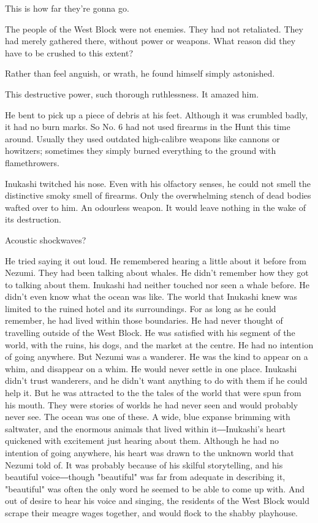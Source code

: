 This is how far they're gonna go.

The people of the West Block were not enemies. They had not retaliated.
They had merely gathered there, without power or weapons. What reason
did they have to be crushed to this extent?

Rather than feel anguish, or wrath, he found himself simply astonished.

This destructive power, such thorough ruthlessness. It amazed him.

He bent to pick up a piece of debris at his feet. Although it was
crumbled badly, it had no burn marks. So No. 6 had not used firearms in
the Hunt this time around. Usually they used outdated high-calibre
weapons like cannons or howitzers; sometimes they simply burned
everything to the ground with flamethrowers.

Inukashi twitched his nose. Even with his olfactory senses, he could not
smell the distinctive smoky smell of firearms. Only the overwhelming
stench of dead bodies wafted over to him. An odourless weapon. It would
leave nothing in the wake of its destruction.

Acoustic shockwaves?

He tried saying it out loud. He remembered hearing a little about it
before from Nezumi. They had been talking about whales. He didn't
remember how they got to talking about them. Inukashi had neither
touched nor seen a whale before. He didn't even know what the ocean was
like. The world that Inukashi knew was limited to the ruined hotel and
its surroundings. For as long as he could remember, he had lived within
those boundaries. He had never thought of travelling outside of the West
Block. He was satisfied with his segment of the world, with the ruins,
his dogs, and the market at the centre. He had no intention of going
anywhere. But Nezumi was a wanderer. He was the kind to appear on a
whim, and disappear on a whim. He would never settle in one place.
Inukashi didn't trust wanderers, and he didn't want anything to do with
them if he could help it. But he was attracted to the the tales of the
world that were spun from his mouth. They were stories of worlds he had
never seen and would probably never see. The ocean was one of these. A
wide, blue expanse brimming with saltwater, and the enormous animals
that lived within it―Inukashi's heart quickened with excitement just
hearing about them. Although he had no intention of going anywhere, his
heart was drawn to the unknown world that Nezumi told of. It was
probably because of his skilful storytelling, and his beautiful
voice―though "beautiful" was far from adequate in describing it,
"beautiful" was often the only word he seemed to be able to come up
with. And out of desire to hear his voice and singing, the residents of
the West Block would scrape their meagre wages together, and would flock
to the shabby playhouse.

